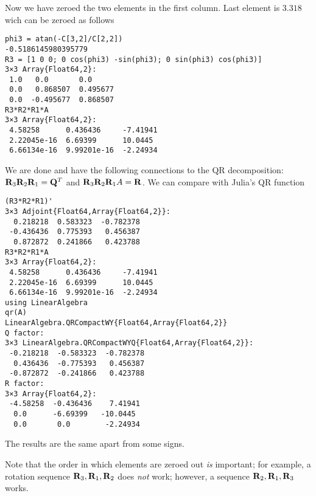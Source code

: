 Now we have zeroed the two elements in the first column. Last element is $3.318$ wich can be zeroed as follows

\begin{verbatim}
phi3 = atan(-C[3,2]/C[2,2])
-0.5186145980395779
R3 = [1 0 0; 0 cos(phi3) -sin(phi3); 0 sin(phi3) cos(phi3)]
3×3 Array{Float64,2}:
 1.0   0.0       0.0     
 0.0   0.868507  0.495677
 0.0  -0.495677  0.868507
R3*R2*R1*A
3×3 Array{Float64,2}:
 4.58258      0.436436     -7.41941
 2.22045e-16  6.69399      10.0445 
 6.66134e-16  9.99201e-16  -2.24934
\end{verbatim}

We are done and have the following connections to the QR decomposition: $\mathbf{R}_3 \mathbf{R}_2 \mathbf{R}_1 = \mathbf{Q}^T$ and $\mathbf{R}_3 \mathbf{R}_2 \mathbf{R}_1 A = \mathbf{R}$. We can compare with Julia's QR function

\begin{verbatim}
(R3*R2*R1)'
3×3 Adjoint{Float64,Array{Float64,2}}:
  0.218218  0.583323  -0.782378
 -0.436436  0.775393   0.456387
  0.872872  0.241866   0.423788
R3*R2*R1*A
3×3 Array{Float64,2}:
 4.58258      0.436436     -7.41941
 2.22045e-16  6.69399      10.0445 
 6.66134e-16  9.99201e-16  -2.24934
using LinearAlgebra
qr(A)
LinearAlgebra.QRCompactWY{Float64,Array{Float64,2}}
Q factor:
3×3 LinearAlgebra.QRCompactWYQ{Float64,Array{Float64,2}}:
 -0.218218  -0.583323  -0.782378
  0.436436  -0.775393   0.456387
 -0.872872  -0.241866   0.423788
R factor:
3×3 Array{Float64,2}:
 -4.58258  -0.436436    7.41941
  0.0      -6.69399   -10.0445 
  0.0       0.0        -2.24934
\end{verbatim}

The results are the same apart from some signs.

Note that the order in which elements are zeroed out \emph{is} important; for example, a rotation sequence $\mathbf{R}_3, \mathbf{R}_1, \mathbf{R}_2$ does \emph{not} work; however, a sequence $\mathbf{R}_2, \mathbf{R}_1, \mathbf{R}_3$ works.

